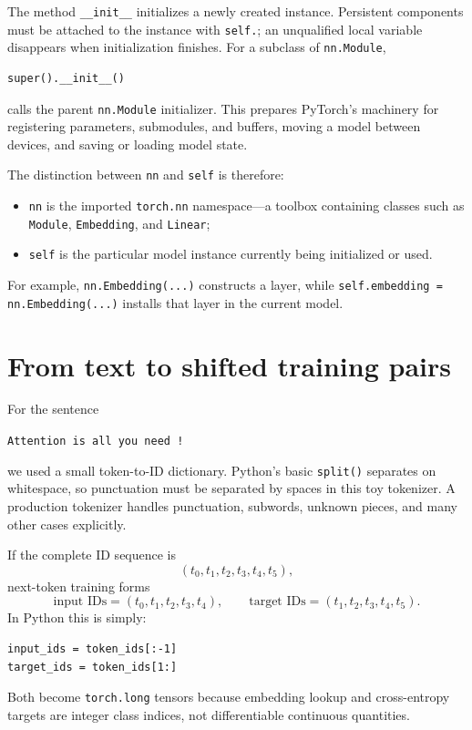 \documentclass[11pt]{article}
\begin{document}
The method \texttt{\_\_init\_\_} initializes a newly created instance. Persistent components must be attached
to the instance with \texttt{self.}; an unqualified local variable disappears when initialization finishes.
For a subclass of \texttt{nn.Module},
\begin{lstlisting}
super().__init__()
\end{lstlisting}
calls the parent \texttt{nn.Module} initializer. This prepares PyTorch's machinery for registering parameters,
submodules, and buffers, moving a model between devices, and saving or loading model state.

The distinction between \texttt{nn} and \texttt{self} is therefore:
\begin{itemize}
  \item \texttt{nn} is the imported \texttt{torch.nn} namespace---a toolbox containing classes such as
  \texttt{Module}, \texttt{Embedding}, and \texttt{Linear};
  \item \texttt{self} is the particular model instance currently being initialized or used.
\end{itemize}
For example, \texttt{nn.Embedding(...)} constructs a layer, while
\texttt{self.embedding = nn.Embedding(...)} installs that layer in the current model.

\section{From text to shifted training pairs}

For the sentence
\begin{center}
\texttt{Attention is all you need !}
\end{center}
we used a small token-to-ID dictionary. Python's basic \texttt{split()} separates on whitespace, so punctuation
must be separated by spaces in this toy tokenizer. A production tokenizer handles punctuation, subwords,
unknown pieces, and many other cases explicitly.

If the complete ID sequence is
\[
(t_0,t_1,t_2,t_3,t_4,t_5),
\]
next-token training forms
\[
\text{input IDs}=(t_0,t_1,t_2,t_3,t_4),\qquad
\text{target IDs}=(t_1,t_2,t_3,t_4,t_5).
\]
In Python this is simply:
\begin{lstlisting}
input_ids = token_ids[:-1]
target_ids = token_ids[1:]
\end{lstlisting}
Both become \texttt{torch.long} tensors because embedding lookup and cross-entropy targets are integer class
indices, not differentiable continuous quantities.
\end{document}
